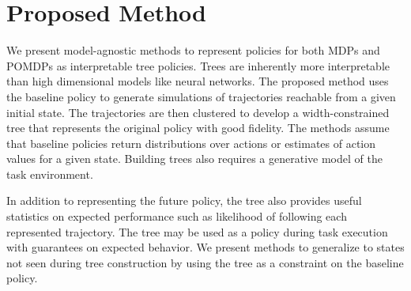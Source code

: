 \documentclass[letterpaper]{article} %
\begin{document}
\section{Proposed Method}
We present model-agnostic methods to represent policies for both MDPs and POMDPs as interpretable tree policies.
Trees are inherently more interpretable than high dimensional models like neural networks.
The proposed method uses the baseline policy to generate simulations of trajectories reachable from a given initial state.
The trajectories are then clustered to develop a width-constrained tree that represents the original policy with good fidelity.
The methods assume that baseline policies return distributions over actions or estimates of action values for a given state.
Building trees also requires a generative model of the task environment.

In addition to representing the future policy, the tree also provides useful statistics on expected performance such as likelihood of following each represented trajectory.
The tree may be used as a policy during task execution with guarantees on expected behavior.
We present methods to generalize to states not seen during tree construction by using the tree as a constraint on the baseline policy.
\end{document}
